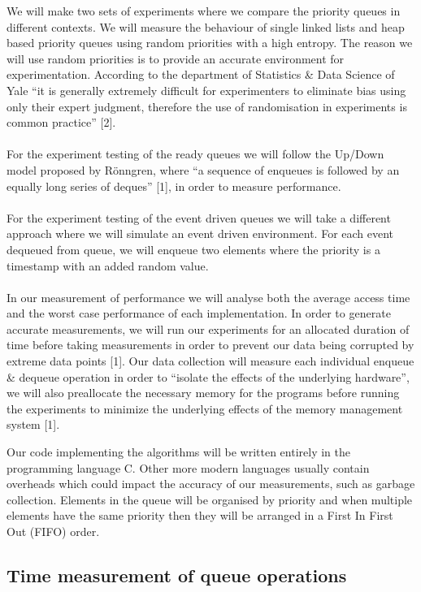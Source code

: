 \documentclass[12pt]{article}
\begin{document}
We will make two sets of experiments where we compare the priority queues in different contexts. We will measure the behaviour of single linked lists and heap based priority queues using random priorities with a high entropy. The reason we will use random priorities is to provide an accurate environment for experimentation. According to the department of Statistics \& Data Science of Yale “it is generally extremely difficult for experimenters to eliminate bias using only their expert judgment, therefore the use of randomisation in experiments is common practice” [2]. 
\\
\\
For the experiment testing of the ready queues we will follow the Up/Down model proposed by Rönngren, where “a sequence of enqueues is followed by an equally long series of deques” [1], in order to measure performance. 
\\
\\
For the experiment testing of the event driven queues we will take a different approach where we will simulate an event driven environment. For each event dequeued from queue, we will enqueue two elements where the priority is a timestamp with an added random value.
\\
\\
In our measurement of performance we will analyse both the average access time and the worst case performance of each implementation. In order to generate accurate measurements, we will run our experiments for an allocated duration of time before taking measurements in order to prevent our data being corrupted by extreme data points [1]. Our data collection will measure each individual enqueue \& dequeue operation in order to “isolate the effects of the underlying hardware”, we will also preallocate the necessary memory for the programs before running the experiments to minimize the underlying effects of the memory management system [1]. 


Our code implementing the algorithms will be written entirely in the programming language C. Other more modern languages usually contain overheads which could impact the accuracy of our measurements, such as garbage collection. Elements in the queue will be organised by priority and when multiple elements have the same priority then they will be arranged in a First In First Out (FIFO) order.

\subsection{Time measurement of queue operations}
\end{document}
